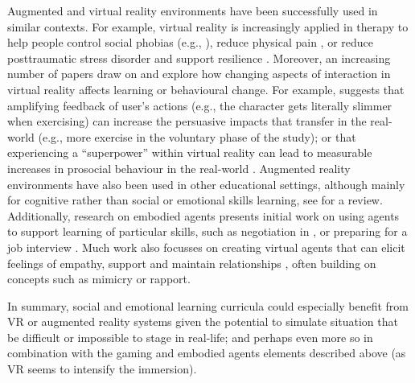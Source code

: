 \documentclass[prodmode,acmtochi]{acmsmall}
\newcommand{\GeraldineFIX}[1]{}
\newcommand{\GeraldineTODO}[1]{}
\begin{document}
\GeraldineTODO{Add a reference to Manuel Sprung's lab?}
\GeraldineFIX{ G: role play also ?  P: Didn't seem to fit here for me as role play is more of a method rather than a skill to be learned ... Also the leading para of this section argues for the use of games as they help support role-play. Maybe that is the place to emphasise this more?}

Augmented and virtual reality environments have been successfully used in similar contexts. For example, virtual reality is increasingly applied in therapy to help people control social phobias (e.g., \cite{Romano2005}), reduce physical pain \cite{Gromala2011}, or reduce posttraumatic stress disorder and support resilience \cite{Rizzo2013}. %
%
Moreover, an increasing number of papers draw on  and explore how changing aspects of interaction in virtual reality affects learning or behavioural change. For example,  suggests that amplifying feedback of user's actions (e.g., the character gets literally slimmer when exercising) can increase the persuasive impacts that transfer in the real-world (e.g., more exercise in the voluntary phase of the study); or that experiencing a ``superpower'' within virtual reality can lead to measurable increases in prosocial behaviour in the real-world \cite{Rosenberg2013}. 
%
Augmented reality environments have also been used in other educational settings, although mainly for cognitive rather than social or emotional skills learning, see  for a review.
%
Additionally, research on embodied agents presents initial work on using agents to support learning of particular skills, such as negotiation in , or preparing for a job interview \cite{Hoque2013}. Much work also focusses on creating virtual agents that can elicit feelings of empathy, support and maintain relationships \cite{Bickmore2005,Bickmore2010}, often building on concepts such as mimicry or rapport. %
\GeraldineFIX{ G: Bickmore's work too? Picard work?? will need to be seem to referencing these labs/people -- P:done ... the Bickmore2005 is both Picard and Bickmore:) ... also Picard was referenced a lot (directly and indirectly) in the earlier affective computing section}
In summary, social and emotional learning curricula could especially benefit from VR or augmented reality systems given the potential to simulate situation that be difficult or impossible to stage in real-life; and perhaps even more so in combination with the gaming and embodied agents elements described above (as VR seems to intensify the immersion). 
\end{document}
